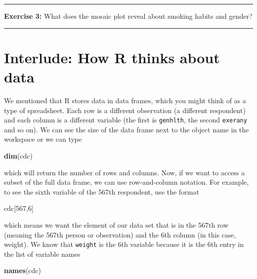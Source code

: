 \documentclass[]{book}
\newenvironment{Shaded}{\begin{snugshade}}{\end{snugshade}}
\newcommand{\DecValTok}[1]{\textcolor[rgb]{0.00,0.00,0.81}{#1}}
\newcommand{\KeywordTok}[1]{\textcolor[rgb]{0.13,0.29,0.53}{\textbf{#1}}}
\newcommand{\NormalTok}[1]{#1}
\theoremstyle{definition}
\theoremstyle{definition}
\theoremstyle{definition}
\theoremstyle{remark}
\begin{document}
\begin{center}\rule{0.5\linewidth}{\linethickness}\end{center}

\textbf{Exercise 3:} What does the mosaic plot reveal about smoking
habits and gender?

\begin{center}\rule{0.5\linewidth}{\linethickness}\end{center}

\hypertarget{interlude-how-r-thinks-about-data}{%
\section{Interlude: How R thinks about
data}\label{interlude-how-r-thinks-about-data}}

We mentioned that R stores data in data frames, which you might think of
as a type of spreadsheet. Each row is a different observation (a
different respondent) and each column is a different variable (the first
is \texttt{genhlth}, the second \texttt{exerany} and so on). We can see
the size of the data frame next to the object name in the workspace or
we can type

\begin{Shaded}
\begin{Highlighting}[]
\KeywordTok{dim}\NormalTok{(cdc)}
\end{Highlighting}
\end{Shaded}

which will return the number of rows and columns. Now, if we want to
access a subset of the full data frame, we can use row-and-column
notation. For example, to see the sixth variable of the 567th
respondent, use the format

\begin{Shaded}
\begin{Highlighting}[]
\NormalTok{cdc[}\DecValTok{567}\NormalTok{,}\DecValTok{6}\NormalTok{]}
\end{Highlighting}
\end{Shaded}

which means we want the element of our data set that is in the 567th row
(meaning the 567th person or observation) and the 6th column (in this
case, weight). We know that \texttt{weight} is the 6th variable because
it is the 6th entry in the list of variable names

\begin{Shaded}
\begin{Highlighting}[]
\KeywordTok{names}\NormalTok{(cdc)}
\end{Highlighting}
\end{Shaded}
\end{document}
